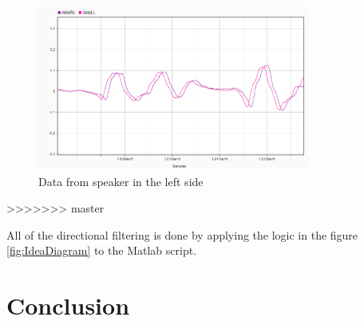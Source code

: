  \begin{figure}[htp]
	\centering
	\includegraphics[width=0.8\textwidth]{Illustrations/DataL.png}
	\caption{Data from speaker in the left side}
	\label{fig:L}
\end{figure}
>>>>>>> master

All of the directional filtering is done by applying the logic in the figure \ref{fig:IdeaDiagram} to the Matlab script. 

\section{Conclusion}
